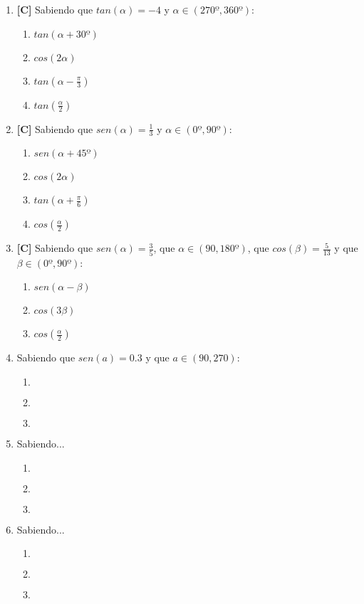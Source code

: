 \begin{enumerate}[topsep=0pt]
	\item \textbf{[C]} Sabiendo que $tan(\alpha) = -4$ y $\alpha \in (270º,360º)$:
		\begin{enumerate}[topsep=0pt, label=\arabic*)]
		\item  $tan(\alpha + 30º)$
		\item $cos(2\alpha)$
		\item $tan(\alpha - \frac{\pi}{3})$
		\item $tan(\frac{\alpha}{2})$
		\end{enumerate}

	\item \textbf{[C]} Sabiendo que $sen(\alpha) = \frac{1}{3}$ y $\alpha \in (0º,90º)$:
		\begin{enumerate}[topsep=0pt, label=\arabic*)]
		\item $sen(\alpha + 45º)$
		\item $cos(2\alpha)$
		\item $tan(\alpha + \frac{\pi}{6})$
		\item $cos(\frac{\alpha}{2})$
		\end{enumerate}
	\item \textbf{[C]} Sabiendo que $sen(\alpha) = \frac{3}{5}$, que $\alpha \in (90,180º)$, que $cos(\beta) = \frac{5}{13}$ y que $ \beta \in (0º,90º)$:
		\begin{enumerate}[topsep=0pt, label=\arabic*)]
		\item $sen(\alpha - \beta)$
		\item $cos(3\beta)$
		\item $cos(\frac{\alpha}{2})$
		\end{enumerate}
	
	\item Sabiendo que $sen(a)=0.3$ y que $a \in (90,270)$:
		\begin{enumerate}[topsep=0pt, label=\arabic*)]
		\item $ $
		\item $ $
		\item $ $
		\end{enumerate}
	
	\item Sabiendo...
	\begin{enumerate}[topsep=0pt, label=\arabic*)]
		\item $ $
		\item $ $
		\item $ $
	\end{enumerate}
	
	\item Sabiendo...
	\begin{enumerate}[topsep=0pt, label=\arabic*)]
		\item $ $
		\item $ $
		\item $ $
	\end{enumerate}
\end{enumerate}


